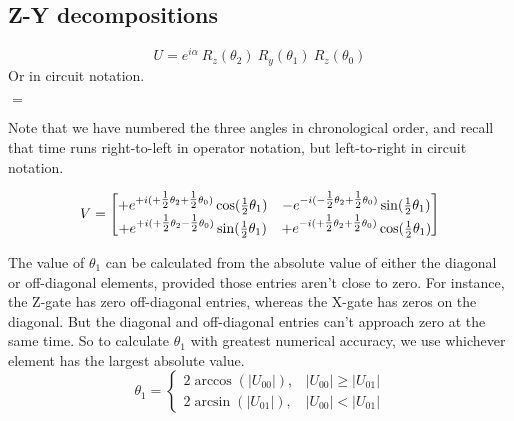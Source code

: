 %
%


\subsection{Z-Y decompositions}

\[
U =  e^{i\alpha}\ R_z(\theta_2)\ R_y(\theta_1)\ R_z(\theta_0)
\]
Or in circuit notation.
\begin{center}
$=$

\end{center}
Note that we have numbered the three angles in chronological order, and recall that time runs right-to-left in operator notation, but left-to-right in circuit notation. 

\[
V = 
\begin{bmatrix}
+e^{+i(+\tfrac{1}{2}\theta_2 + \tfrac{1}{2}\theta_0)} \cos(\tfrac{1}{2}\theta_1) 
& -e^{-i(-\tfrac{1}{2}\theta_2 + \tfrac{1}{2}\theta_0)} \sin(\tfrac{1}{2}\theta_1) 
\\
+e^{+i(+\tfrac{1}{2}\theta_2 - \tfrac{1}{2}\theta_0)} \sin(\tfrac{1}{2}\theta_1) 
& +e^{-i(+\tfrac{1}{2}\theta_2 +\tfrac{1}{2}\theta_0)} \cos(\tfrac{1}{2}\theta_1)
\end{bmatrix}
\]


The value of $\theta_1$ can be calculated from the absolute value of either the diagonal or off-diagonal elements, provided those entries aren't close to zero.
For instance, the Z-gate has zero off-diagonal entries, whereas the X-gate has zeros on the diagonal. But the diagonal and off-diagonal entries can't approach zero at the same time.  So to calculate $\theta_1$ with greatest numerical accuracy, we use whichever element has the largest absolute value.
\[
\theta_1 = 
  \begin{cases}
		2 \arccos(|U_{00}|), & |U_{00}| \geq |U_{01}|\\	
		2 \arcsin(|U_{01}|), & |U_{00}| < |U_{01}|		
	\end{cases} 
\]

